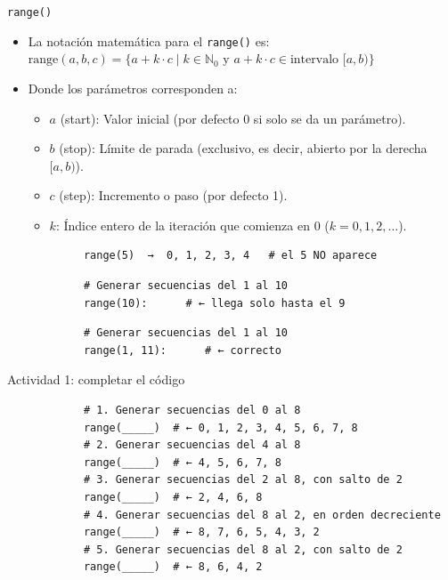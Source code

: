 \documentclass{beamer}
\begin{document}
    \begin{frame}[fragile,t]{\texttt{range()}}
        \begin{itemize}
            \item La notación matemática para el \texttt{range()} es: \(\text{range}(a,b,c)=\{a+k\cdot c\mid k\in \mathbb{N}_{0}\text{\ y\ }a+k\cdot c\in \text{intervalo\ }[a,b)\}\)
            \item Donde los parámetros corresponden a:
            \begin{itemize}
                \item \(a\) (start): Valor inicial (por defecto 0 si solo se da un parámetro).
                \item \(b\) (stop): Límite de parada (exclusivo, es decir, abierto por la derecha \([a, b)\)).
                \item \(c\) (step): Incremento o paso (por defecto 1).
                \item \(k\): Índice entero de la iteración que comienza en 0 (\(k = 0, 1, 2, \dots\)).
            \end{itemize}
        \end{itemize}
        \begin{verbatim}
            range(5)  →  0, 1, 2, 3, 4   # el 5 NO aparece 
        \end{verbatim}
        \begin{verbatim}
            # Generar secuencias del 1 al 10
            range(10):      # ← llega solo hasta el 9
        \end{verbatim}
        \begin{verbatim}
            # Generar secuencias del 1 al 10
            range(1, 11):      # ← correcto
        \end{verbatim}
    \end{frame}

    \begin{frame}[fragile,t]{Actividad 1: completar el código}
        \begin{verbatim}
            # 1. Generar secuencias del 0 al 8
            range(_____)  # ← 0, 1, 2, 3, 4, 5, 6, 7, 8
            # 2. Generar secuencias del 4 al 8
            range(_____)  # ← 4, 5, 6, 7, 8
            # 3. Generar secuencias del 2 al 8, con salto de 2
            range(_____)  # ← 2, 4, 6, 8
            # 4. Generar secuencias del 8 al 2, en orden decreciente
            range(_____)  # ← 8, 7, 6, 5, 4, 3, 2
            # 5. Generar secuencias del 8 al 2, con salto de 2
            range(_____)  # ← 8, 6, 4, 2
        \end{verbatim}
    \end{frame}
\end{document}

